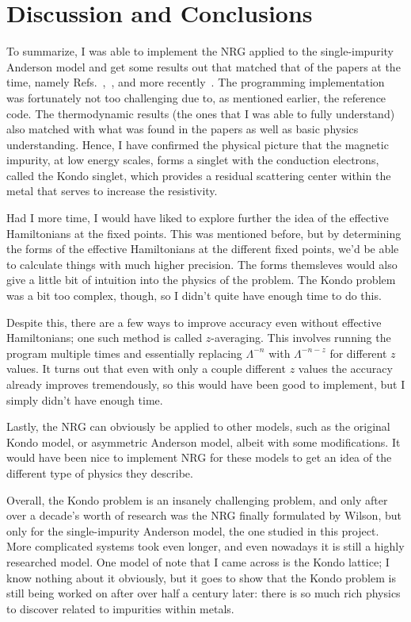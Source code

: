 \section{Discussion and Conclusions}

To summarize, I was able to implement the NRG applied to the single-impurity Anderson model and get some results out that matched that of the papers at the time, namely Refs.~\cite{Wilson_1975},~\cite{Krishna-murthy_Wilkins_Wilson_1980}, and more recently~\cite{Bulla_2008}. The programming implementation was fortunately not too challenging due to, as mentioned earlier, the reference code. The thermodynamic results (the ones that I was able to fully understand) also matched with what was found in the papers as well as basic physics understanding. Hence, I have confirmed the physical picture that the magnetic impurity, at low energy scales, forms a singlet with the conduction electrons, called the Kondo singlet, which provides a residual scattering center within the metal that serves to increase the resistivity.

Had I more time, I would have liked to explore further the idea of the effective Hamiltonians at the fixed points. This was mentioned before, but by determining the forms of the effective Hamiltonians at the different fixed points, we'd be able to calculate things with much higher precision. The forms themsleves would also give a little bit of intuition into the physics of the problem. The Kondo problem was a bit too complex, though, so I didn't quite have enough time to do this.

Despite this, there are a few ways to improve accuracy even without effective Hamiltonians; one such method is called $z$-averaging. This involves running the program multiple times and essentially replacing $\Lambda^{-n}$ with $\Lambda^{-n-z}$ for different $z$ values. It turns out that even with only a couple different $z$ values the accuracy already improves tremendously, so this would have been good to implement, but I simply didn't have enough time.

Lastly, the NRG can obviously be applied to other models, such as the original Kondo model, or asymmetric Anderson model, albeit with some modifications. It would have been nice to implement NRG for these models to get an idea of the different type of physics they describe.

Overall, the Kondo problem is an insanely challenging problem, and only after over a decade's worth of research was the NRG finally formulated by Wilson, but only for the single-impurity Anderson model, the one studied in this project. More complicated systems took even longer, and even nowadays it is still a highly researched model. One model of note that I came across is the Kondo lattice; I know nothing about it obviously, but it goes to show that the Kondo problem is still being worked on after over half a century later: there is so much rich physics to discover related to impurities within metals.





